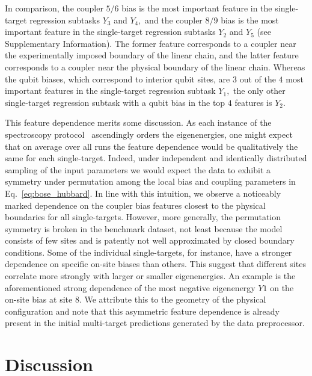 \documentclass[aps,twocolumn,superscriptaddress,floatfix,preprintnumbers,showkeys]{revtex4}
\begin{document}
In comparison, the coupler $5/6$ bias is the most important feature in the single-target regression subtasks $Y_{3}$ and $Y_{4},$ and the coupler $8/9$ bias is the most important feature in the single-target regression subtasks $Y_{2}$ and $Y_{5}$ (see Supplementary Information). The former feature corresponds to a coupler near the experimentally imposed boundary of the linear chain, and the latter feature corresponds to a coupler near the physical boundary of the linear chain. Whereas the qubit biases, which correspond to interior qubit sites, are $3$ out of the $4$ most important features in the single-target regression subtask $Y_{1},$ the only other single-target regression subtask with a qubit bias in the top $4$ features is $Y_{2}.$ 

This feature dependence merits some discussion. As each instance of the spectroscopy protocol~\cite{Roushan_2017} ascendingly orders the eigenenergies, one might expect that on average over all runs the feature dependence would be qualitatively the same for each single-target. Indeed, under independent and identically distributed sampling of the input parameters we would expect the data to exhibit a symmetry under permutation among the local bias and coupling parameters in Eq.~\ref{eq:bose_hubbard}. In line with this intuition, we observe a noticeably marked dependence on the coupler bias features closest to the physical boundaries for all single-targets. However, more generally, the permutation symmetry is broken in the benchmark dataset, not least because the model consists of few sites and is patently not well approximated by closed boundary conditions. Some of the individual single-targets, for instance, have a stronger dependence on specific on-site biases than others. This suggest that different sites correlate more strongly with larger or smaller eigenenergies. An example is the aforementioned strong dependence of the most negative eigenenergy $Y1$ on the on-site bias at site $8$. We attribute this to the geometry of the physical configuration and note that this asymmetric feature dependence is already present in the initial multi-target predictions generated by the data preprocessor.

\section*{Discussion}
\end{document}
